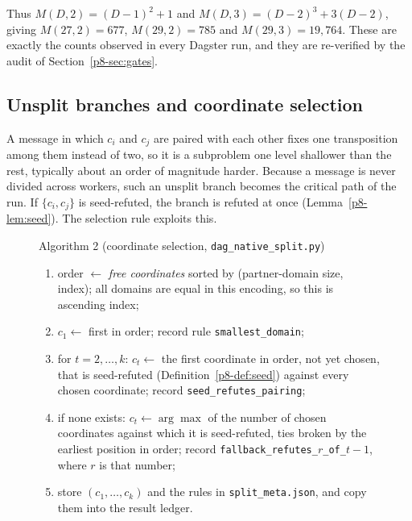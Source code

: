 \documentclass[11pt,a4paper,oneside]{report}
\theoremstyle{definition}
\newcommand{\code}[1]{\texttt{#1}}
\begin{document}
Thus $M(D,2)=(D-1)^2+1$ and $M(D,3)=(D-2)^3+3(D-2)$, giving $M(27,2)=677$,
$M(29,2)=785$ and $M(29,3)=19{,}764$. These are exactly the counts observed in every Dagster
run, and they are re-verified by the audit of Section~\ref{p8-sec:gates}.

\subsection{Unsplit branches and coordinate selection}\label{p8-sec:rule}

A message in which $c_i$ and $c_j$ are paired with each other fixes one transposition among
them instead of two, so it is a subproblem one level shallower than the rest, typically
about an order of magnitude harder. Because a message is never divided across workers, such
an unsplit branch becomes the critical path of the run. If $\{c_i,c_j\}$ is
seed-refuted, the branch is refuted at once (Lemma~\ref{p8-lem:seed}). The selection rule
exploits this.

\begin{figure}[H]
\centering
\begin{minipage}{0.92\linewidth}\small
Algorithm 2 (coordinate selection, \code{dag\_native\_split.py})\label{p8-alg:sel}
\begin{enumerate}[nosep, label=\arabic*.]
\item order $\leftarrow$ \emph{free coordinates} sorted by (partner-domain size, index); all domains
are equal in this encoding, so this is ascending index;
\item $c_1\leftarrow$ first in order; record rule \code{smallest\_domain};
\item for $t=2,\dots,k$: $c_t\leftarrow$ the first coordinate in order, not yet chosen, that is
seed-refuted (Definition~\ref{p8-def:seed}) against every chosen coordinate; record
\code{seed\_refutes\_pairing};
\item if none exists: $c_t\leftarrow\arg\max$ of the number of chosen coordinates against which
it is seed-refuted, ties broken by the earliest position in order; record
\code{fallback\_refutes\_}$r$\code{\_of\_}$t{-}1$, where $r$ is that number;
\item store $(c_1,\dots,c_k)$ and the rules in \code{split\_meta.json}, and copy them into the
result ledger.
\end{enumerate}
\end{minipage}
\end{figure}
\end{document}
